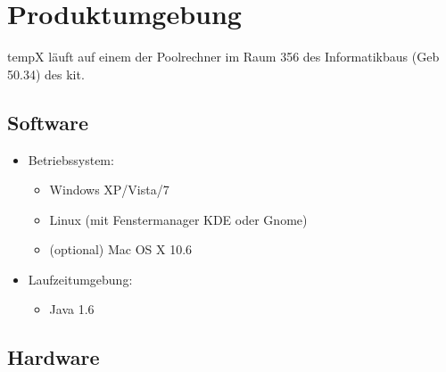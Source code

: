 \section{Produktumgebung}

\gls{tempX} läuft auf einem der Poolrechner im Raum 356 des Informatikbaus (Geb 50.34) des \gls{kit}.

\subsection{Software}

	\begin{itemize}
		
		\item Betriebssystem: 
		\begin{itemize}
			\item Windows XP/Vista/7
			\item Linux (mit Fenstermanager KDE oder Gnome)
			\item (optional) Mac OS X 10.6
		\end{itemize}
	
		\item Laufzeitumgebung:
		\begin{itemize}
			\item Java 1.6
		\end{itemize}
		
	\end{itemize}
	
\subsection{Hardware}

